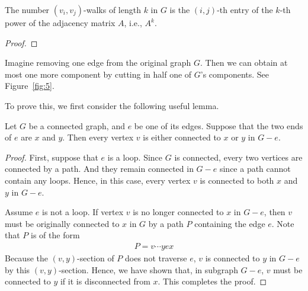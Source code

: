 \documentclass[thmcnt=section, 12pt, color=cyan]{my-elegantbook}
\begin{document}
\begin{proposition}
    The number $(v_i, v_j)$-walks of length $k$ in $G$ is the $(i,j)$-th entry of the $k$-th power of the adjacency matrix $A$, i.e., $A^k$.
\end{proposition}

\begin{proof}
\end{proof}


Imagine removing one edge from the original graph $G$.
Then we can obtain at most one more component 
by cutting in half one of $G$'s components.
See Figure~\ref{fig:5}.

To prove this, we first consider
the following useful lemma.

\begin{lemma} \label{lem:1}
	Let $G$ be a connected graph, 
	and $e$ be one of its edges.
	Suppose that the two ends of $e$ are $x$ and $y$.
	Then every vertex $v$ is either connected to $x$
	or $y$ in $G-e$.
\end{lemma}

\begin{proof}
	First, suppose that $e$ is a loop.
	Since $G$ is connected, 
	every two vertices are connected by a path.
	And they remain connected in $G-e$ 
	since a path cannot contain any loops.
	Hence, in this case, every vertex $v$ 
	is connected to both $x$ and $y$ in $G-e$.

	Assume $e$ is not a loop. 
	If vertex $v$ is no longer connected to $x$ in $G-e$,
	then $v$ must be originally connected to $x$
	in $G$
	by a path $P$ containing the edge $e$.
	Note that $P$ is of the form 
	\begin{align*}
		P = v \cdots y e x
	\end{align*}
	Because the $(v,y)$-section of $P$ does not traverse $e$,
	$v$ is connected to $y$ in $G-e$ by this $(v,y)$-section.
	Hence, we have shown that, 
	in subgraph $G-e$, 
	$v$ must be connected to $y$ 
	if it is disconnected from $x$.
	This completes the proof.
\end{proof}
\end{document}
